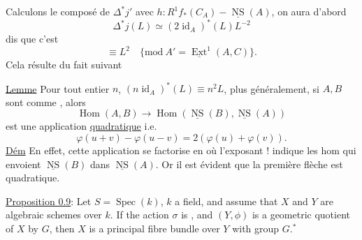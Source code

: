 Calculons le composé  de $\Delta^*j'$ avec $h:R^1f_*(C_A)\mathbin{-}\underline{\operatorname{NS}}(A)$, on aura d'abord
\[
\Delta^*j(L)\simeq(2\operatorname{id}_A)^*(L)L^{-2}
\]
 dis que c'est
\[
\equiv L^2\quad\{\mathrm{mod}\ A'=\underline{\operatorname{Ext}}^1(A,C)\}.
\]
Cela résulte du fait suivant

\uline{Lemme} Pour tout entier $n$, $(n\operatorname{id}_A)^*(L)\equiv n^2L$,
 plus généralement, si $A,B$ sont comme , alors
\[
\operatorname{Hom}(A,B)\longrightarrow\operatorname{Hom}(\underline{\operatorname{NS}}(B),\underline{\operatorname{NS}}(A))
\]
est une application \uline{quadratique} i.e.
\[
\varphi(u+v)-\varphi(u-v)=2(\varphi(u)+\varphi(v)).
\]
 \uline{Dém} En effet, cette application se factorise en
où l'exposant ! indique les hom qui envoient $\underline{\operatorname{NS}}(B)$ dans $\underline{\operatorname{NS}}(A)$.  Or il est évident que la première flèche est quadratique.




\uline{Proposition 0.9}: Let $S=\operatorname{Spec}(k)$, $k$ a field, and assume that
$X$ and $Y$ are algebraic schemes over $k$. If the action $\sigma$ is
,
and $(Y,\phi)$ is a geometric quotient of $X$ by $G$, then $X$ is a principal fibre bundle over $Y$ with group $G$.${}^*$

